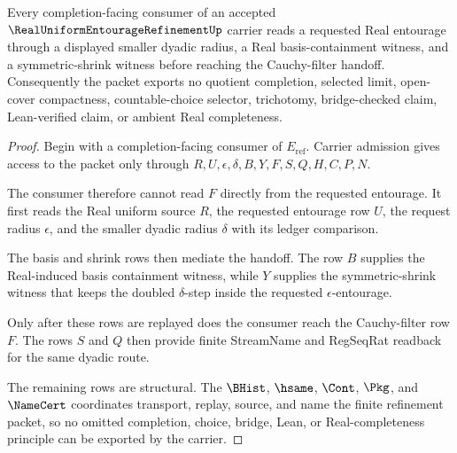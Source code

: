 \begin{theorem}
\label{thm:real-uniform-entourage-refinement-handoff}
Every completion-facing consumer of an accepted $\RealUniformEntourageRefinementUp$ carrier reads a requested Real entourage through a displayed smaller dyadic radius, a Real basis-containment witness, and a symmetric-shrink witness before reaching the Cauchy-filter handoff. Consequently the packet exports no quotient completion, selected limit, open-cover compactness, countable-choice selector, trichotomy, bridge-checked claim, Lean-verified claim, or ambient Real completeness.
\end{theorem}
\begin{proof}
Begin with a completion-facing consumer of $E_{\mathrm{ref}}$. Carrier admission gives access to the packet only through $R,U,\epsilon,\delta,B,Y,F,S,Q,H,C,P,N$.

The consumer therefore cannot read $F$ directly from the requested entourage. It first reads the Real uniform source $R$, the requested entourage row $U$, the request radius $\epsilon$, and the smaller dyadic radius $\delta$ with its ledger comparison.

The basis and shrink rows then mediate the handoff. The row $B$ supplies the Real-induced basis containment witness, while $Y$ supplies the symmetric-shrink witness that keeps the doubled $\delta$-step inside the requested $\epsilon$-entourage.

Only after these rows are replayed does the consumer reach the Cauchy-filter row $F$. The rows $S$ and $Q$ then provide finite StreamName and RegSeqRat readback for the same dyadic route.

The remaining rows are structural. The $\BHist$, $\hsame$, $\Cont$, $\Pkg$, and $\NameCert$ coordinates transport, replay, source, and name the finite refinement packet, so no omitted completion, choice, bridge, Lean, or Real-completeness principle can be exported by the carrier.
\end{proof}



